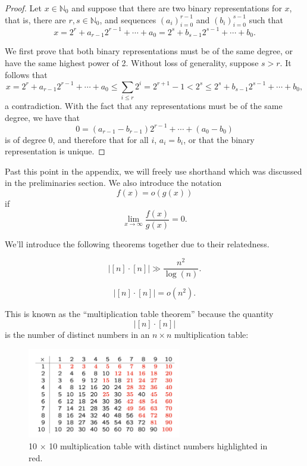 \documentclass[12pt,reqno]{amsart}
\begin{document}
\begin{proof}
Let \(x \in \mathbb{N}_{0}  \) and suppose that there are two binary representations for \(x\),
that is, there are \(r,s \in \mathbb{N}_{0}  \), and sequences \((a_{i} )_{i = 0} ^{r-1}\) and \(\left( b_{i}  \right) _{i = 0} ^{s - 1}\)
such that
\[
    x = 2^{r} + a_{r-1}2^{r-1} + \cdots + a_{0} = 2^{s} + b_{s - 1} 2^{s - 1} + \cdots + b_0  
.\]

We first prove that both binary representations must be of the same degree, or have
the same highest power of 2. Without loss of generality, suppose \(s > r\). It follows that
\[
    x = 2^{r} + a_{r-1} 2^{r-1} + \cdots + a_0 \leq \sum _{i \leq r} 2^{i} = 2^{r+1} - 1 < 2^{s} \leq 2^{s} + b_{s-1} 2^{s-1} + \cdots  + b_0
,\]
a contradiction. With the fact that any representations must be of the same degree,
we have that
\[
    0 = \left( a_{r-1} - b_{r-1}  \right) 2^{r-1} + \cdots + \left( a_0-b_0 \right)
\]
is of degree 0, and therefore that for all \(i\), \(a_{i} = b_{i} \), or that
the binary representation is unique.

\end{proof}

Past this point in the appendix, we will freely use shorthand which was discussed in the preliminaries
section. We also introduce the notation
\[
    f(x) = o(g(x))
\]
if
\[
    \lim_{x \to \infty} \frac{f(x)}{g(x)} = 0 
.\]

We'll introduce the following theorems together due to their relatedness.

\begin{theorem*}
\[
    \left\lvert [n] \cdot [n] \right\rvert \gg \frac{n ^{2}}{\log \left( n \right) }    
.\]
\end{theorem*}

\begin{theorem*}
\[
    \left\lvert [n] \cdot [n] \right\rvert = o(n^{2})
.\]
\end{theorem*}

This is known as the ``multiplication table theorem'' because the quantity
\[
    \left\lvert [n] \cdot [n] \right\rvert 
\]
is the number of distinct numbers in an \(n \times n\) multiplication table:

\begin{figure}[h]
    \centering
    \includegraphics[width=0.6\textwidth]{mult-table.png}
    \caption{10 \(\times \) 10 multiplication table with distinct numbers highlighted in red.}
\end{figure}
\end{document}

